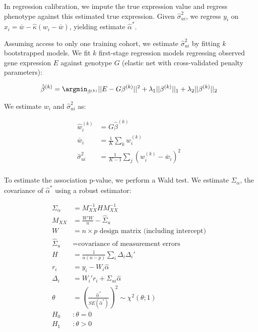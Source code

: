 \documentclass{article}
\begin{document}
In regression calibration, we impute the true expression value and regress
phenotype against this estimated true expression. Given $\hat\sigma_{ui}^2$, we
regress $y_i$ on $\hat x_i = \bar w - \hat\kappa (w_i - \bar w)$, yielding
estimate $\hat\alpha^*$.

Assuming access to only one training cohort, we estimate $\hat\sigma_{ui}^2$ by
fitting $k$ bootstrapped models. We fit $k$ first-stage regression models
regressing observed gene expression $E$ against genotype $G$ (elastic net with
cross-validated penalty parameters):

\begin{align*}
    \hat\beta^{(k)} = \argmin_{\beta^{(k)}} ||E - G\beta^{(k)}||^2 +
    \lambda_1||\beta^{(k)}||_1 + \lambda_2||\beta^{(k)}||_2\\
\end{align*}

We estimate $w_i$ and $\hat\sigma_{ui}^2$ as:

\begin{align*}
  \hat w_i^{(k)} &= G \hat{\beta}^{(k)}\\
  \bar w_i &= \frac{1}{K} \sum_{k}{w_i^{(k)}}\\
  \hat\sigma_{ui}^2 &= \frac{1}{K - 1} \sum_j (w_i^{(k)} - \bar w_i)^2\\
\end{align*}

To estimate the association p-value, we perform a Wald test. We estimate
$\Sigma_\alpha$, the covariance of $\hat\alpha^*$ using a robust
estimator\cite{fuller1987}:

\begin{align*}
  \Sigma_\alpha &= M_{XX}^{-1} H M_{XX}^{-1}\\
  M_{XX} &= \frac{W' W}{n} - \hat\Sigma_u\\
  W &= \text{$n \times p$ design matrix (including intercept)}\\
  \hat\Sigma_u &= \text{covariance of measurement errors}\\
  H &= \frac{1}{n(n - p)} \sum_i \Delta_i \Delta_i'\\
  r_i &= y_i - W_i \hat\alpha\\
  \Delta_i &= W_i' r_i + \Sigma_{ui} \hat\alpha\\
  \theta &= \left(\frac{\hat\alpha^*}{SE(\hat\alpha^*)}\right)^2 \sim \chi^2(\theta; 1)\\
  H_0&: \theta = 0\\
  H_1&: \theta > 0\\
\end{align*}
\end{document}
